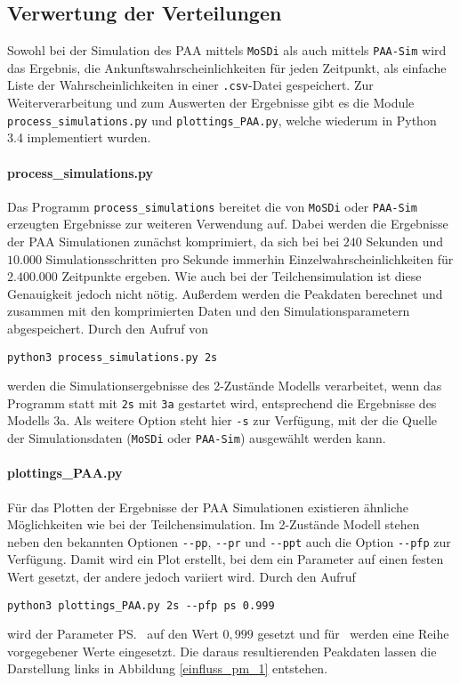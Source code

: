 \subsection{Verwertung der Verteilungen}
Sowohl bei der Simulation des PAA mittels \texttt{MoSDi} als auch mittels \texttt{PAA-Sim} wird das Ergebnis, die Ankunftswahrscheinlichkeiten für jeden Zeitpunkt, als einfache Liste der Wahrscheinlichkeiten in einer \texttt{.csv}-Datei gespeichert. Zur Weiterverarbeitung und zum Auswerten der Ergebnisse gibt es die Module \verb!process_simulations.py! und \verb!plottings_PAA.py!, welche wiederum in Python 3.4 implementiert wurden.

\paragraph{process\_simulations.py}
Das Programm \verb!process_simulations! bereitet die von \texttt{MoSDi} oder \texttt{PAA-Sim} erzeugten Ergebnisse zur weiteren Verwendung auf. Dabei werden die Ergebnisse der PAA Simulationen zunächst komprimiert, da sich bei bei $240$ Sekunden und $10.000$ Simulationsschritten pro Sekunde immerhin Einzelwahrscheinlichkeiten für $2.400.000$ Zeitpunkte ergeben. Wie auch bei der Teilchensimulation ist diese Genauigkeit jedoch nicht nötig. 
Außerdem werden die Peakdaten berechnet und zusammen mit den komprimierten Daten und den Simulationsparametern abgespeichert.
Durch den Aufruf von 
\begin{verbatim}
python3 process_simulations.py 2s  
\end{verbatim}
werden die Simulationsergebnisse des 2-Zustände Modells verarbeitet, wenn das Programm statt mit \verb!2s! mit \verb!3a! gestartet wird, entsprechend die Ergebnisse des Modells 3a.
Als weitere Option steht hier \verb!-s! zur Verfügung, mit der die Quelle der Simulationsdaten (\texttt{MoSDi} oder \texttt{PAA-Sim}) ausgewählt werden kann.

\paragraph{plottings\_PAA.py}
Für das Plotten der Ergebnisse der PAA Simulationen existieren ähnliche Möglichkeiten wie bei der Teilchensimulation.
Im 2-Zustände Modell stehen neben den bekannten Optionen \verb!--pp!, \verb!--pr! und \verb!--ppt! auch die Option \verb!--pfp! zur Verfügung. Damit wird ein Plot erstellt, bei dem ein Parameter auf einen festen Wert gesetzt, der andere jedoch variiert wird. Durch den Aufruf
\begin{verbatim}
python3 plottings_PAA.py 2s --pfp ps 0.999
\end{verbatim}
wird der Parameter \ps\ auf den Wert $0,999$ gesetzt und für \pm\ werden eine Reihe vorgegebener Werte eingesetzt. Die daraus resultierenden Peakdaten lassen die Darstellung links in Abbildung \ref{einfluss_pm_1} entstehen.

